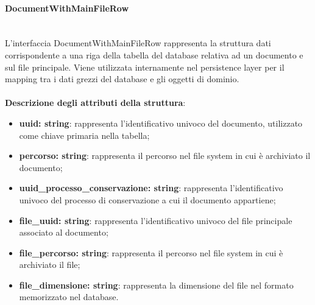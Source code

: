 \documentclass[a4paper,12pt]{article}
\begin{document}
{{{                \paragraph{DocumentWithMainFileRow}\label{par:DocumentWithMainFileRow}\mbox{}\\
                L'interfaccia DocumentWithMainFileRow rappresenta la struttura dati corrispondente a una riga della tabella del database relativa ad un documento e sul file principale. Viene utilizzata internamente nel persistence layer per il mapping tra i dati grezzi del database e gli oggetti di dominio.\\
                \\
                \textbf{Descrizione degli attributi della struttura}:
                \begin{itemize}
                    \item \textbf{uuid: string}: rappresenta l'identificativo univoco del documento, utilizzato come chiave primaria nella tabella;
                    \item \textbf{percorso: string}: rappresenta il percorso nel file system in cui è archiviato il documento;
                    \item \textbf{uuid\_processo\_conservazione: string}: rappresenta l'identificativo univoco del processo di conservazione a cui il documento appartiene;
                    \item \textbf{file\_uuid: string}: rappresenta l'identificativo univoco del file principale associato al documento;
                    \item \textbf{file\_percorso: string}: rappresenta il percorso nel file system in cui è archiviato il file;
                    \item \textbf{file\_dimensione: string}: rappresenta la dimensione del file nel formato memorizzato nel database.
                \end{itemize}
}}}
\end{document}
